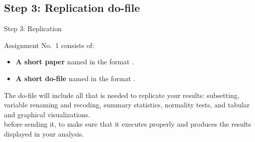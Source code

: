 \documentclass{beamer}
\begin{document}
	\subsection{Step 3: Replication do-file}

	\begin{frame}[t]{Step 3: Replication}
	
	Assignment No.~1 consists of:
	
	\begin{itemize}
		\item \textbf{A short paper} named in the format .
		\item \textbf{A short do-file} named in the format .
	\end{itemize}
	
	The do-file will include all that is needed to replicate your results: subsetting, variable renaming and recoding, summary statistics, normality tests, and tabular and graphical visualizations.\\[1em]
	
	 before sending it, to make sure that it executes properly and produces the results displayed in your analysis.\\[.5em]

	\end{frame}
	
\end{document}
